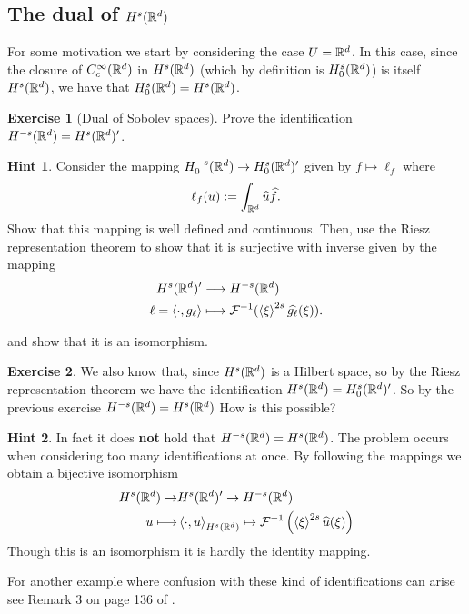\documentclass[12pt]{article}
\theoremstyle{definition}
\newtheorem{exercise}{Exercise}
\newtheorem*{hint}{Hint}
\newcommand{\br}[1]{\left\langle#1\right\rangle} \newcommand{\set}[1]{\left\{#1\right\}} \newcommand{\qp}[1]{\left(#1\right)}\newcommand{\qb}[1]{\left[#1\right]}
\begin{document}
\subsection{The dual of $H^s(\mathbb{R}^d)$}
For some motivation we start by considering the case $U=\mathbb{R}^d$. In this case, since the closure of
$C_c^\infty(\mathbb{R}^d)$ in $H^s(\mathbb{R}^d)$ (which by definition is $H_0^s(\mathbb{R}^d)$) is itself $H^s(\mathbb{R}^d)$, we have that $H_0^s(\mathbb{R}^d)=H^s(\mathbb{R}^d)$.
\begin{exercise}[Dual of Sobolev spaces]\label{dual exercise}
  Prove the identification $H^{-s}(\mathbb{R}^d)=H^s(\mathbb{R}^d)'$.
\end{exercise}
\begin{hint}

  Consider the mapping  $H_0^{-s}(\mathbb{R}^d) \to H^s_0(\mathbb{R}^d)'$ given by $f \mapsto \ell_f$ where
  \begin{align*}
    \ell_f(u):= \int_{\mathbb{R}^d}\widehat{u} \widehat{f} .
  \end{align*}
  Show that this mapping is well defined and continuous. Then, use the Riesz representation theorem to show that it is surjective with inverse given by the mapping
  \begin{align*}
    H^s(\R^d)'                & \longrightarrow H^{-s}(\R^d)                                 \\
    \ell = \br{\cdot, g_\ell} & \longmapsto \mathcal{F}^{-1}(\br{\xi}^{2s}\wh{g_\ell}(\xi ))
    .\end{align*}


  and show that it is an isomorphism.
\end{hint}
\begin{exercise}
  We also know that, since $H^s(\mathbb{R}^d)$ is a Hilbert space, so by the Riesz representation theorem we have the identification $H^s(\mathbb{R}^d) = H^{s}_0(\mathbb{R}^d)'$. So by the previous exercise $H^{-s}(\mathbb{R}^d)= H^s(\mathbb{R}^d)$ How is this possible?
\end{exercise}
\begin{hint}
  In fact it does \textbf{not} hold that $H^{-s}(\mathbb{R}^d)= H^s(\mathbb{R}^d)$. The problem occurs when considering too many identifications at once. By following the mappings we obtain a bijective isomorphism
  \begin{align*}
    H^{s}(\R^d) \to & H^s(\R^d)' \to H^{-s}(\R^d)                                                              \\
    u \longmapsto   & \br{\cdot, u}_{H^s(\R^d)} \mapsto \mathcal{F}^{-1}\left(\br{\xi}^{2s}\wh{u}(\xi )\right)
  \end{align*}
  Though this is an isomorphism it is hardly the identity mapping.
\end{hint}
For another example where confusion with these kind of identifications can arise see Remark 3 on page  136 of \cite{brezis2011functional}.
\end{document}
